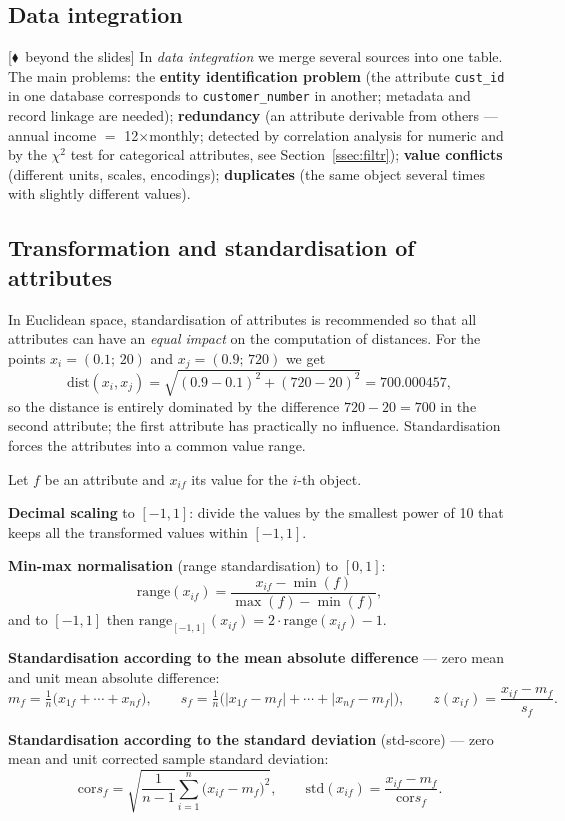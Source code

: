 \documentclass[11pt,a4paper]{article}
\theoremstyle{definition}
\newcommand{\mimo}{\textcolor{markcol}{\textsf{\footnotesize[$\blacklozenge$~beyond the slides]}}}
\begin{document}
\subsection{Data integration}

\mimo{} In \emph{data integration} we merge several sources into one table. The main problems:
the \textbf{entity identification problem} (the attribute \texttt{cust\_id} in one database
corresponds to \texttt{customer\_number} in another; metadata and record linkage are needed);
\textbf{redundancy} (an attribute derivable from others --- annual income $=$ 12$\times$monthly;
detected by correlation analysis for numeric and by the $\chi^2$ test for categorical
attributes, see Section~\ref{ssec:filtr}); \textbf{value conflicts} (different units, scales,
encodings); \textbf{duplicates} (the same object several times with slightly different values).

\subsection{Transformation and standardisation of attributes}

In Euclidean space, standardisation of attributes is recommended so that all attributes can have
an \emph{equal impact} on the computation of distances. For the points $x_i=(0.1;\,20)$ and
$x_j=(0.9;\,720)$ we get
\[ \mathrm{dist}(x_i,x_j)=\sqrt{(0.9-0.1)^2+(720-20)^2}=700.000457, \]
so the distance is entirely dominated by the difference $720-20=700$ in the second attribute;
the first attribute has practically no influence. Standardisation forces the attributes into a
common value range.

\begin{defbox}
Let $f$ be an attribute and $x_{if}$ its value for the $i$-th object.

\textbf{Decimal scaling} to $[-1,1]$: divide the values by the smallest power of 10 that keeps
all the transformed values within $[-1,1]$.

\textbf{Min-max normalisation} (range standardisation) to $[0,1]$:
\[ \mathrm{range}(x_{if})=\frac{x_{if}-\min(f)}{\max(f)-\min(f)}, \]
and to $[-1,1]$ then $\mathrm{range}_{[-1,1]}(x_{if})=2\cdot \mathrm{range}(x_{if})-1$.

\textbf{Standardisation according to the mean absolute difference} --- zero mean and unit mean
absolute difference:
\[ m_f=\tfrac1n\big(x_{1f}+\cdots+x_{nf}\big),\qquad
s_f=\tfrac1n\big(|x_{1f}-m_f|+\cdots+|x_{nf}-m_f|\big),\qquad
z(x_{if})=\frac{x_{if}-m_f}{s_f}. \]

\textbf{Standardisation according to the standard deviation} (std-score) --- zero mean and unit
corrected sample standard deviation:
\[ \mathrm{cor}s_f=\sqrt{\frac{1}{n-1}\sum_{i=1}^n\big(x_{if}-m_f\big)^2},\qquad
\mathrm{std}(x_{if})=\frac{x_{if}-m_f}{\mathrm{cor}s_f}. \]
\end{defbox}
\end{document}
